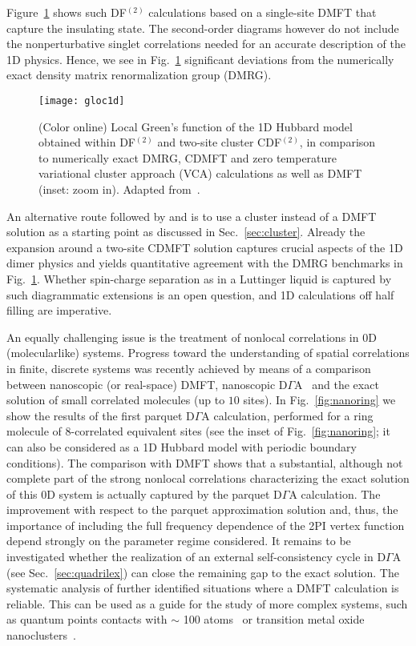 \documentclass[rmp,aps,reprint,amsmath,amssymb,superscriptaddress,showpacs,nofootinbib]{revtex4-1}
\begin{document}
Figure~\ref{fig:gloc1d} shows such  DF$^{(2)}$ calculations  based on a single-site DMFT that capture the insulating state. The second-order diagrams however do not include the nonperturbative singlet correlations needed for an accurate description of the 1D physics. Hence, we see in Fig.~\ref{fig:gloc1d} significant deviations from the numerically exact density matrix renormalization group (DMRG).

\begin{figure}[tb]
  \texttt{[image: gloc1d]}
    \caption{(Color online) Local Green's function of the 1D Hubbard model obtained within DF$^{(2)}$ and two-site cluster CDF$^{(2)}$, in comparison to numerically exact DMRG, CDMFT and zero temperature variational cluster approach (VCA) calculations as well as DMFT (inset: zoom in). Adapted from~.}
  \label{fig:gloc1d}
\end{figure}

An alternative route followed by   and  is to use a cluster instead of a DMFT solution as a starting point as discussed in Sec.~\ref{sec:cluster}. Already the expansion around a two-site  CDMFT solution captures crucial aspects of the 1D dimer physics and yields quantitative agreement with the DMRG benchmarks in Fig.~\ref{fig:gloc1d}. Whether spin-charge separation as in a Luttinger liquid is captured by such diagrammatic extensions is an open question, and 1D calculations off half filling are imperative.

An equally challenging issue is the treatment of nonlocal correlations in 0D (molecularlike) systems. Progress toward the understanding of spatial correlations in finite, discrete systems was recently achieved by means of a comparison~\cite{Valli2012,Valli2015} between nanoscopic (or real-space) DMFT, nanoscopic D$\Gamma$A~\cite{Valli2010} and the exact solution of small correlated molecules (up to $10$ sites). In Fig.~\ref{fig:nanoring} we show the results of the first parquet D$\Gamma$A calculation, performed for a ring  molecule of 8-correlated equivalent sites (see the inset of Fig.~\ref{fig:nanoring}; it can also be considered as a 1D Hubbard model with periodic boundary conditions). The comparison with DMFT shows that a substantial, although not complete part of  the strong nonlocal correlations characterizing the exact solution of this 0D system is actually captured by the parquet D$\Gamma$A calculation. The improvement with respect to the parquet approximation solution and, thus, the importance of including the full frequency dependence of the 2PI vertex function depend strongly on the parameter regime considered. It remains to be investigated whether the realization of an external self-consistency cycle in D$\Gamma$A (see Sec.~\ref{sec:quadrilex}) can close the remaining gap to the exact solution. The systematic analysis of  further identified situations where a DMFT calculation is reliable. This can be used as a guide for the study of more complex systems, such as quantum points contacts with $\sim$ 100 atoms~\cite{Florens2007,Valli2010,Jacob2010} or transition metal oxide nanoclusters~\cite{Das2011,Valli2015a}.
\end{document}

